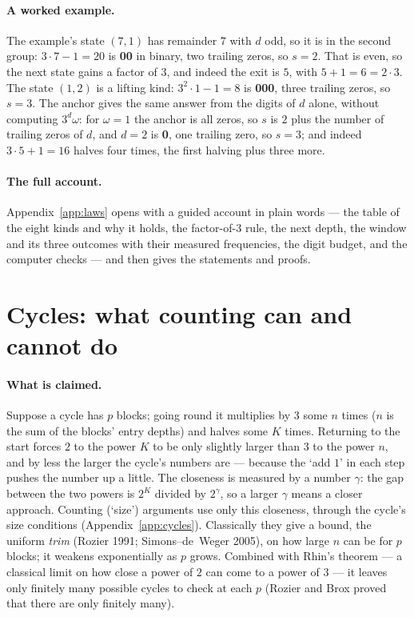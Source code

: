 \documentclass[11pt]{article}
\newcommand{\bin}[1]{{\fontencoding{T1}\fontfamily{zi4}\selectfont #1}}%
\theoremstyle{remark}
\newcommand{\w}{\omega}
\begin{document}
\paragraph{A worked example.} The example's state $(7,1)$ has remainder $7$ with $d$ odd, so it is in the second group: $3 \cdot 7 - 1 = 20$ is \bin{101\textbf{00}} in binary, two trailing zeros, so $s = 2$. That is even, so the next state gains a factor of $3$, and indeed the exit is $5$, with $5 + 1 = 6 = 2 \cdot 3$. The state $(1,2)$ is a lifting kind: $3^2 \cdot 1 - 1 = 8$ is \bin{1\textbf{000}}, three trailing zeros, so $s = 3$. The anchor gives the same answer from the digits of $d$ alone, without computing $3^d\w$: for $\w = 1$ the anchor is all zeros, so $s$ is $2$ plus the number of trailing zeros of $d$, and $d = 2$ is \bin{1\textbf{0}}, one trailing zero, so $s = 3$; and indeed $3 \cdot 5 + 1 = 16$ halves four times, the first halving plus three more.

\paragraph{The full account.} Appendix~\ref{app:laws} opens with a guided account in plain words --- the table of the eight kinds and why it holds, the factor-of-$3$ rule, the next depth, the window and its three outcomes with their measured frequencies, the digit budget, and the computer checks --- and then gives the statements and proofs.

\section{Cycles: what counting can and cannot do}\label{sec:cycles}

\paragraph{What is claimed.} Suppose a cycle has $p$ blocks; going round it multiplies by $3$ some $n$ times ($n$ is the sum of the blocks' entry depths) and halves some $K$ times. Returning to the start forces $2$ to the power $K$ to be only slightly larger than $3$ to the power $n$, and by less the larger the cycle's numbers are --- because the `add $1$' in each step pushes the number up a little. The closeness is measured by a number $\gamma$: the gap between the two powers is $2^K$ divided by $2^{\gamma}$, so a larger $\gamma$ means a closer approach. Counting (`size') arguments use only this closeness, through the cycle's size conditions (Appendix~\ref{app:cycles}). Classically they give a bound, the uniform \emph{trim} (Rozier 1991; Simons--de~Weger 2005), on how large $n$ can be for $p$ blocks; it weakens exponentially as $p$ grows. Combined with Rhin's theorem --- a classical limit on how close a power of $2$ can come to a power of $3$ --- it leaves only finitely many possible cycles to check at each $p$ (Rozier and Brox proved that there are only finitely many).
\end{document}
